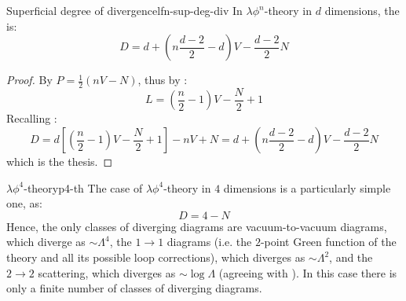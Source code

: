 \begin{theorem}{Superficial degree of divergence}{lfn-sup-deg-div}
  In $ \lambda \phi^n $-theory in $ d $ dimensions, the  is:
    \begin{equation}
      D = d + \left( n \frac{d - 2}{2} - d \right) V - \frac{d - 2}{2} N
      \label{eq:lfn-sup-deg-div}
    \end{equation}
\end{theorem}

\begin{proofbox}
  \begin{proof}
    By  $ P = \frac{1}{2} (n V - N) $, thus by :
    \begin{equation*}
      L = \left( \frac{n}{2} - 1 \right) V - \frac{N}{2} + 1
    \end{equation*}
    Recalling :
    \begin{equation*}
      D = d \left[ \left( \frac{n}{2} - 1 \right) V - \frac{N}{2} + 1 \right] - n V + N = d + \left( n \frac{d - 2}{2} - d \right) V - \frac{d - 2}{2} N
    \end{equation*}
    which is the thesis.
  \end{proof}
\end{proofbox}

\begin{example}{$ \lambda \phi^4 $-theory}{p4-th}
  The case of $ \lambda \phi^4 $-theory in $ 4 $ dimensions is a particularly simple one, as:
  \begin{equation}
    D = 4 - N
  \end{equation}
  Hence, the only classes of diverging diagrams are vacuum-to-vacuum diagrams, which diverge as $ \sim \Lambda^4 $, the $ 1 \rightarrow 1 $ diagrams (i.e. the $ 2 $-point Green function of the theory and all its possible loop corrections), which diverges as $ \sim \Lambda^2 $, and the $ 2 \rightarrow 2 $ scattering, which diverges as $ \sim \log \Lambda $ (agreeing with ). In this case there is only a finite number of classes of diverging diagrams.
\end{example}

